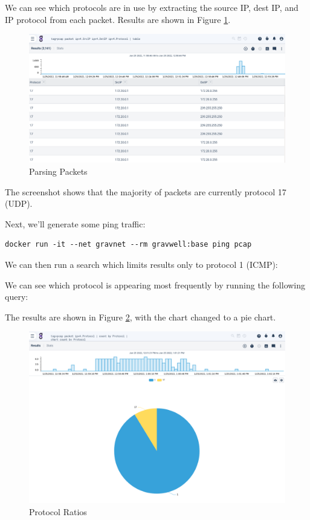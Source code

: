 We can see which protocols are in use by extracting the source IP,
dest IP, and IP protocol from each packet. Results are shown in Figure \ref{fig:pcap-lab2}.



\begin{figure}
	\includegraphics[width=0.8\linewidth]{images/igst-pcap-lab2.png}
	\caption{Parsing Packets}
	\label{fig:pcap-lab2}
\end{figure}

The screenshot shows that the majority of packets are currently
protocol 17 (UDP).

Next, we'll generate some ping traffic:

\begin{Verbatim}[breaklines=true]
docker run -it --net gravnet --rm gravwell:base ping pcap
\end{Verbatim}

We can then run a search which limits results only to protocol 1
(ICMP):



We can see which protocol is appearing most frequently by running the
following query:


The results are shown in Figure \ref{fig:pcap-lab3}, with the chart changed to a pie chart.

\begin{figure}
	\includegraphics[width=0.8\linewidth]{images/igst-pcap-lab3.png}
	\caption{Protocol Ratios}
	\label{fig:pcap-lab3}
\end{figure}

